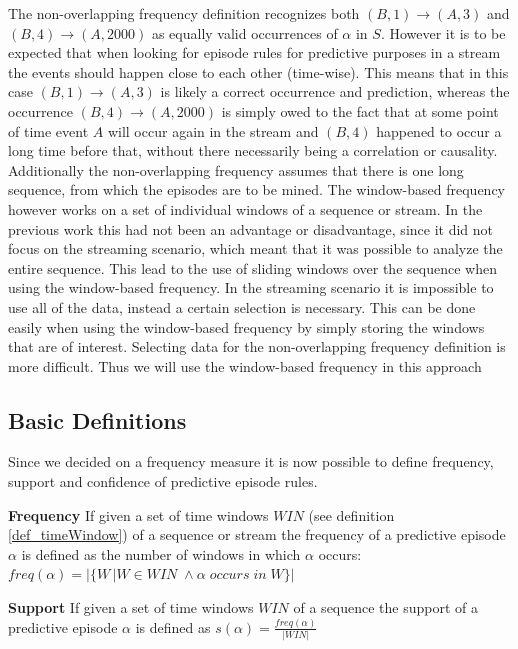 The non-overlapping frequency definition recognizes both $(B,1) \rightarrow (A,3)$ and $(B,4) \rightarrow (A,2000)$ as equally valid occurrences of $\alpha$ in $S$. However it is to be expected that when looking for episode rules for predictive purposes in a stream the events should happen close to each other (time-wise). This means that in this case $(B,1) \rightarrow (A,3)$ is likely a correct occurrence and prediction, whereas the occurrence $(B,4) \rightarrow (A,2000)$ is simply owed to the fact that at some point of time event $A$ will occur again in the stream and $(B,4)$ happened to occur a long time before that, without there necessarily being a correlation or causality.
Additionally the non-overlapping frequency assumes that there is one long sequence, from which the episodes are to be mined. The window-based frequency however works on a set of individual windows of a sequence or stream. In the previous work this had not been an advantage or disadvantage, since it did not focus on the streaming scenario, which meant that it was possible to analyze the entire sequence. This lead to the use of sliding windows over the sequence when using the window-based frequency. In the streaming scenario it is impossible to use all of the data, instead a certain selection is necessary. This can be done easily when using the window-based frequency by simply storing the windows that are of interest. Selecting data for the non-overlapping frequency definition is more difficult. Thus we will use the window-based frequency in this approach

\subsection{Basic Definitions}
Since we decided on a frequency measure it is now possible to define frequency, support and confidence of predictive episode rules.

\begin{mydef}
\label{def_frequency}
\textbf{Frequency} If given a set of time windows $WIN$ (see definition \ref{def_timeWindow}) of a sequence or stream the frequency of a predictive episode $\alpha$ is defined as the number of windows in which $\alpha$ occurs: $freq(\alpha) = |\{W\,|W \in WIN\; \land \alpha\; occurs \; in \; W\}|$
\end{mydef}

\begin{mydef}
\label{def_support}
\textbf{Support} If given a set of time windows $WIN$ of a sequence the support of a predictive episode $\alpha$ is defined as $s(\alpha) = \frac{freq(\alpha)}{|WIN|}$
\end{mydef}

